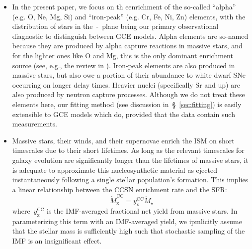 \documentclass[ms.tex]{subfiles}
\begin{document}
\begin{itemize}

	\item In the present paper, we focus on th eenrichment of the so-called
	``alpha'' (e.g. O, Ne, Mg, Si) and ``iron-peak'' (e.g. Cr, Fe, Ni, Zn)
	elements, with the distribution of stars in the~\afe-\feh~plane being our
	primary observational diagnostic to distinguish between GCE models.
	Alpha elements are so-named because they are produced by alpha capture
	reactions in massive stars, and for the lighter ones like O and Mg, this
	is the only dominant enrichment source (see, e.g., the review in
	\citealp{Johnson2019}).
	Iron-peak elements are also produced in massive stars, but also owe a
	portion of their abundance to white dwarf SNe occurring on longer delay
	times.
	Heavier nuclei (specifically Sr and up) are also produced by neutron
	capture processes.
	Although we do not treat these elements here, our fitting method (see
	discussion in~\S~\ref{sec:fitting}) is easily extensible to GCE models
	which do, provided that the data contain such measurements.

	\item Massive stars, their winds, and their supernovae enrich the ISM on
	short timescales due to their short lifetimes.
	As long as the relevant timescales for galaxy evolution are significantly
	longer than the lifetimes of massive stars, it is adequate to approximate
	this nucleosynthetic material as ejected instantaneously following a single
	stellar population's formation.
	This implies a linear relationship between the CCSN enrichment rate and
	the SFR:
	\begin{equation}
	\label{eq:mdot_cc}
	\dot{M}_\text{x}^\text{CC} = y_\text{x}^\text{CC}\dot{M}_\star
	\end{equation}
	where~$y_\text{x}^\text{CC}$ is the IMF-averaged fractional net yield from
	massive stars.
	In parameterizing this term with an IMF-averaged yield, we ipmlicitly assume
	that the stellar mass is sufficiently high such that stochastic sampling of
	the IMF is an insignificant effect.



\end{itemize}
\end{document}
